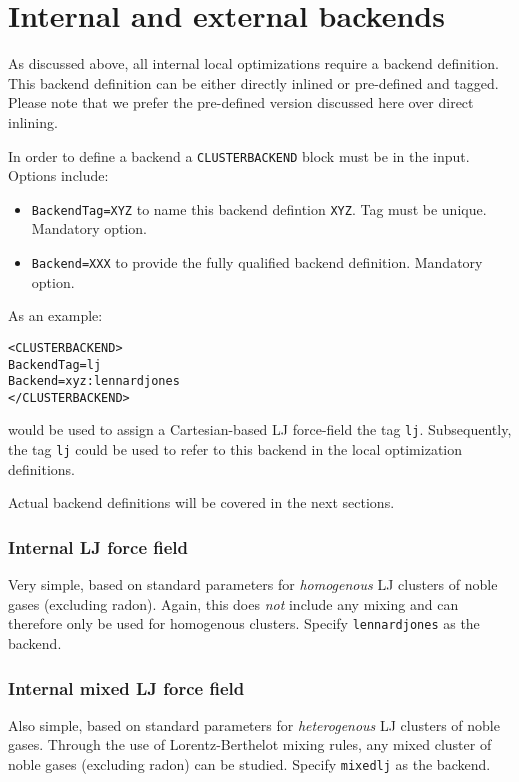 \documentclass[a4paper,10pt]{scrbook}
\begin{document}
\section{Internal and external backends}
As discussed above, all internal local optimizations require a backend 
definition. This backend definition can be
either directly inlined or pre-defined and tagged. Please note that we prefer 
the pre-defined version discussed
here over direct inlining.

In order to define a backend a \texttt{CLUSTERBACKEND} block must be in the 
input. Options include:
\begin{itemize}
 \item \texttt{BackendTag=XYZ} to name this backend defintion \texttt{XYZ}. Tag 
must be unique. Mandatory option.
 \item \texttt{Backend=XXX} to provide the fully qualified backend definition. 
Mandatory option.
\end{itemize}

As an example:
\begin{verbatim}
<CLUSTERBACKEND>
BackendTag=lj
Backend=xyz:lennardjones
</CLUSTERBACKEND>
\end{verbatim}
would be used to assign a Cartesian-based LJ force-field the tag \texttt{lj}. 
Subsequently, the tag \texttt{lj}
could be used to refer to this backend in the local optimization definitions.

Actual backend definitions will be covered in the next sections.

\subsubsection{Internal LJ force field}
Very simple, based on standard parameters for \emph{homogenous} LJ clusters of
noble gases (excluding radon). Again, this does \emph{not} include any mixing 
and can therefore only be used for
homogenous clusters. Specify \texttt{lennardjones} as the backend.

\subsubsection{Internal mixed LJ force field}
Also simple, based on standard parameters for \emph{heterogenous} LJ clusters of
noble gases. Through the
use of Lorentz-Berthelot mixing rules, any mixed cluster of noble gases
(excluding radon) can be studied. Specify \texttt{mixedlj} as the backend.
\end{document}
